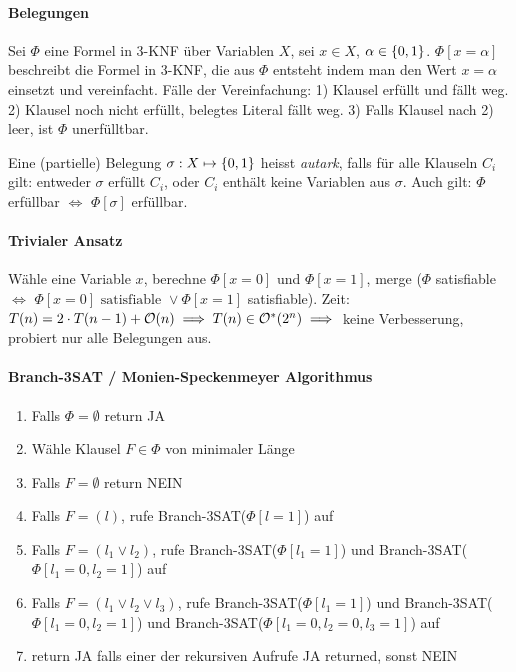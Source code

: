 \paragraph{Belegungen}
Sei $\Phi$ eine Formel in 3-KNF über Variablen $X$, sei $x \in X$, $\alpha \in \lbrace 0, 1 \rbrace$.
$\Phi[x=\alpha]$ beschreibt die Formel in 3-KNF, die aus $\Phi$ entsteht indem man den Wert $x=\alpha$ einsetzt
und vereinfacht.
Fälle der Vereinfachung:
1) Klausel erfüllt und fällt weg.
2) Klausel noch nicht erfüllt, belegtes Literal fällt weg.
3) Falls Klausel nach 2) leer, ist $\Phi$ unerfülltbar.

Eine (partielle) Belegung $\sigma : X \mapsto \lbrace 0, 1 \rbrace$ heisst \emph{autark}, falls für alle Klauseln $C_i$ gilt:
entweder $\sigma$ erfüllt $C_i$, oder $C_i$ enthält keine Variablen aus $\sigma$.
Auch gilt: $\Phi$ erfüllbar $\iff$ $\Phi[\sigma]$ erfüllbar.

\paragraph{Trivialer Ansatz}
Wähle eine Variable $x$, berechne $\Phi[x=0]$ und $\Phi[x=1]$,
merge ($\Phi$ satisfiable $\iff$ $\Phi[x=0] \text{ satisfiable } \vee \Phi[x=1]$ satisfiable).
Zeit: $T(n) = 2 \cdot T(n-1) + \mathcal{O}(n) \implies T(n) \in \mathcal{O}^*(2^n) \implies$ keine Verbesserung,
probiert nur alle Belegungen aus.

\paragraph{Branch-3SAT / Monien-Speckenmeyer Algorithmus}
\begin{enumerate}
    \item Falls $\Phi = \emptyset$ return JA
    \item Wähle Klausel $F \in  \Phi$ von minimaler Länge
    \item Falls $F = \emptyset$ return NEIN
    \item Falls $F = (l)$, rufe Branch-3SAT($\Phi[l=1]$) auf
    \item Falls $F = (l_1 \vee l_2)$, rufe Branch-3SAT($\Phi[l_1=1]$) und Branch-3SAT($\Phi[l_1=0, l_2=1]$) auf
    \item Falls $F = (l_1 \vee l_2 \vee l_3)$, rufe Branch-3SAT($\Phi[l_1=1]$) und
    Branch-3SAT($\Phi[l_1=0, l_2=1]$) und Branch-3SAT($\Phi[l_1=0, l_2=0, l_3=1]$) auf
    \item return JA falls einer der rekursiven Aufrufe JA returned, sonst NEIN
\end{enumerate}

